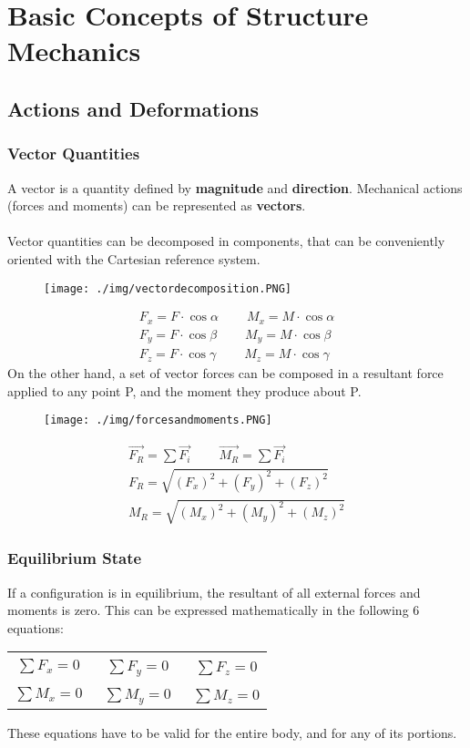 \chapter{Basic Concepts of Structure Mechanics}
\section{Actions and Deformations}
\subsection{Vector Quantities}
A vector is a quantity defined by \textbf{magnitude} and \textbf{direction}. Mechanical actions (forces and moments) can be represented as \textbf{vectors}. \\\\
Vector quantities can be decomposed in components, that can be conveniently oriented with the Cartesian reference system.
\begin{figure}[H]
  \centering
  \texttt{[image: ./img/vectordecomposition.PNG]}
\end{figure}
\begin{gather}
  F_x = F \cdot \cos \alpha \ \ \ \ \ \ \ \ \ \ M_x = M \cdot \cos \alpha \\
  F_y = F \cdot \cos \beta \ \ \ \ \ \ \ \ \ \ M_y = M \cdot \cos \beta \\
  F_z = F \cdot \cos \gamma \ \ \ \ \ \ \ \ \ \ M_z = M \cdot \cos \gamma
\end{gather}
On the other hand, a set of vector forces can be composed in a resultant force applied to any point P, and the moment they produce about P.
\begin{figure}[H]
  \centering
  \texttt{[image: ./img/forcesandmoments.PNG]}
\end{figure}
\begin{gather}
  \vec{F_R} = \sum \vec{F_i} \ \ \ \ \ \ \ \ \ \ \vec{M_R} = \sum \vec{F_i} \\
  F_R = \sqrt{(F_x)^2 + (F_y)^2 + (F_z)^2} \\
  M_R = \sqrt{(M_x)^2 + (M_y)^2 + (M_z)^2}
\end{gather}
\subsection{Equilibrium State}
If a configuration is in equilibrium, the resultant of all external forces and moments is zero. This can be expressed mathematically in the following 6 equations:
\begin{center}
  \begin{tabular}{ c c c }
    $\sum F_x = 0$ & \ $\sum F_y = 0$ & \ $\sum F_z = 0$ \\
    $\sum M_x = 0$ & \ $\sum M_y = 0$ & \ $\sum M_z = 0$
  \end{tabular}
\end{center}
These equations have to be valid for the entire body, and for any of its portions.
